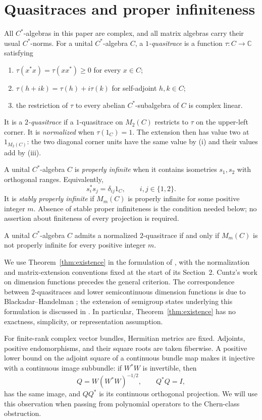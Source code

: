 \section{Quasitraces and proper infiniteness}
\label{sec:preliminaries}

All \(C^*\)-algebras in this paper are complex, and all matrix
algebras carry their usual \(C^*\)-norms. For a unital \(C^*\)-algebra
\(C\), a \emph{\(1\)-quasitrace} is a function
\(\tau:C\to\mathbb C\) satisfying
\begin{enumerate}[label=\textup{(\roman*)}]
\item \(\tau(x^*x)=\tau(xx^*)\ge0\) for every \(x\in C\);
\item \(\tau(h+ik)=\tau(h)+i\tau(k)\) for self-adjoint \(h,k\in C\);
\item the restriction of \(\tau\) to every abelian \(C^*\)-subalgebra
of \(C\) is complex linear.
\end{enumerate}
It is a \emph{\(2\)-quasitrace} if a \(1\)-quasitrace on \(M_2(C)\)
restricts to \(\tau\) on the upper-left corner. It is
\emph{normalized} when \(\tau(1_C)=1\).
The extension then has value two at \(1_{M_2(C)}\): the two
diagonal corner units have the same value by \textup{(i)} and
their values add by \textup{(iii)}.

A unital \(C^*\)-algebra \(C\) is \emph{properly infinite} when it
contains isometries \(s_1,s_2\) with orthogonal ranges. Equivalently,
\[
 s_i^*s_j=\delta_{ij}1_C,\qquad i,j\in\{1,2\}.
\]
It is \emph{stably properly infinite} if \(M_m(C)\) is properly
infinite for some positive integer \(m\). Absence of stable proper
infiniteness is the condition needed below; no assertion about
finiteness of every projection is required.

\begin{theorem}
\label{thm:existence}
A unital \(C^*\)-algebra \(C\) admits a normalized \(2\)-quasitrace
if and only if \(M_m(C)\) is not properly infinite for every
positive integer \(m\).
\end{theorem}

We use Theorem~\ref{thm:existence} in the formulation of
\cite[Theorem~2.3]{MR}, with the normalization and matrix-extension
conventions fixed at the start of its Section~2. Cuntz's work on
dimension functions \cite{Cuntz1978} precedes the general criterion.
The correspondence between \(2\)-quasitraces and lower semicontinuous
dimension functions is due to Blackadar--Handelman
\cite[Theorems~II.2.2 and II.3.1]{BH}; the extension of
semigroup states underlying this formulation is discussed in
\cite{BR}. In particular, Theorem~\ref{thm:existence} has no exactness,
simplicity, or representation assumption.

For finite-rank complex vector bundles, Hermitian metrics are fixed.
Adjoints, positive endomorphisms, and their square roots are taken
fiberwise. A positive lower bound on the adjoint square of a
continuous bundle map makes it injective with a continuous image
subbundle: if \(W^*W\) is invertible, then
\[
 Q=W(W^*W)^{-1/2},\qquad Q^*Q=I,
\]
has the same image, and \(QQ^*\) is its continuous orthogonal
projection. We will use this observation when passing from
polynomial operators to the Chern-class obstruction.
